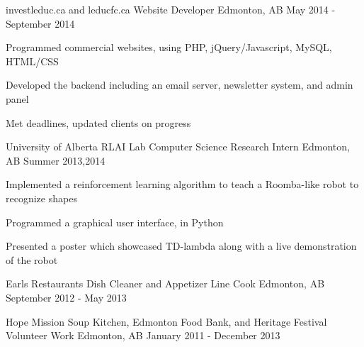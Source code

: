 \begin{cventries}
\cventry
{investleduc.ca and leducfc.ca} %
{Website Developer} %
{Edmonton, AB} %
{May 2014 - September 2014} %
{ %
\begin{cvitems}
\item {Programmed commercial websites, using PHP, jQuery/Javascript, MySQL, HTML/CSS}
\item {Developed the backend including an email server, newsletter system, and admin panel}
\item {Met deadlines, updated clients on progress}
\end{cvitems}
}


\cventry
{University of Alberta RLAI Lab} %
{Computer Science Research Intern} %
{Edmonton, AB} %
{Summer 2013,2014} %
{ %
\begin{cvitems}
\item {Implemented a reinforcement learning algorithm to teach a Roomba-like robot to recognize shapes}
\item {Programmed a graphical user interface, in Python}
\item {Presented a poster which showcased TD-lambda along with a live demonstration of the robot}
\end{cvitems}
}


\cventry
{Earls Restaurants} %
{Dish Cleaner and Appetizer Line Cook} %
{Edmonton, AB} %
{September 2012 - May 2013} %
{}


\cventry
{Hope Mission Soup Kitchen, Edmonton Food Bank, and Heritage Festival} %
{Volunteer Work} %
{Edmonton, AB} %
{January 2011 - December 2013} %
{}

\end{cventries}

\newpage
